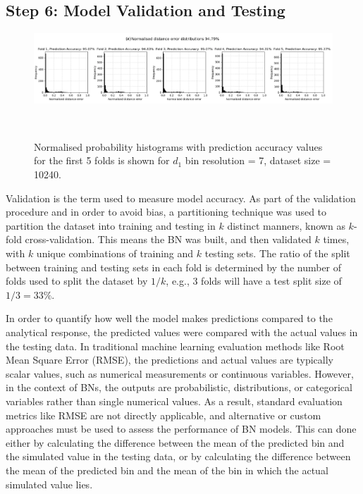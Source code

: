 \documentclass[journal]{IEEEtran}
\begin{document}
\subsection{\textbf{Step 6}: Model Validation and Testing}\label{sec:meth_validation} 

\begin{figure}
    \centering
    \includegraphics[width=\textwidth]{figures/validation_plots/PROCESS/st20_d1_7bins_folds.png}
    \caption{\small Normalised probability histograms with prediction accuracy values for the first 5 folds is shown for $d_{1}$ bin resolution = 7, dataset size = 10240.}~\label{fig:k-foldhistograms}
\end{figure}

Validation is the term used to measure model accuracy. As part of the validation procedure and in order to avoid bias, a partitioning technique was used to partition the dataset into training and testing in $k$ distinct manners, known as $k$-fold cross-validation. This means the BN was built, and then validated $k$ times, with $k$ unique combinations of training and $k$ testing sets. The ratio of the split between training and testing sets in each fold is determined by the number of folds used to split the dataset by $1/k$, e.g., 3 folds will have a test split size of $1/3 = 33\%$. 

In order to quantify how well the model makes predictions compared to the analytical response, the predicted values were compared with the actual values in the testing data. In traditional machine learning evaluation methods like Root Mean Square Error (RMSE), the predictions and actual values are typically scalar values, such as numerical measurements or continuous variables. However, in the context of BNs, the outputs are probabilistic, distributions, or categorical variables rather than single numerical values. As a result, standard evaluation metrics like RMSE are not directly applicable, and alternative or custom approaches must be used to assess the performance of BN models. This can done either by calculating the difference between the mean of the predicted bin and the simulated value in the testing data, or by calculating the difference between the mean of the predicted bin and the mean of the bin in which the actual simulated value lies.
\end{document}
